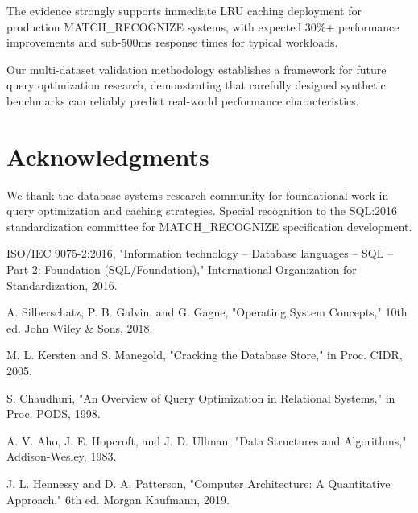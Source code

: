 \documentclass[conference]{IEEEtran}
\begin{document}
The evidence strongly supports immediate LRU caching deployment for production MATCH\_RECOGNIZE systems, with expected 30\%+ performance improvements and sub-500ms response times for typical workloads.

Our multi-dataset validation methodology establishes a framework for future query optimization research, demonstrating that carefully designed synthetic benchmarks can reliably predict real-world performance characteristics.

\section*{Acknowledgments}

We thank the database systems research community for foundational work in query optimization and caching strategies. Special recognition to the SQL:2016 standardization committee for MATCH\_RECOGNIZE specification development.

\begin{thebibliography}{00}
 ISO/IEC 9075-2:2016, "Information technology -- Database languages -- SQL -- Part 2: Foundation (SQL/Foundation)," International Organization for Standardization, 2016.

 A. Silberschatz, P. B. Galvin, and G. Gagne, "Operating System Concepts," 10th ed. John Wiley \& Sons, 2018.

 M. L. Kersten and S. Manegold, "Cracking the Database Store," in Proc. CIDR, 2005.

 S. Chaudhuri, "An Overview of Query Optimization in Relational Systems," in Proc. PODS, 1998.

 A. V. Aho, J. E. Hopcroft, and J. D. Ullman, "Data Structures and Algorithms," Addison-Wesley, 1983.

 J. L. Hennessy and D. A. Patterson, "Computer Architecture: A Quantitative Approach," 6th ed. Morgan Kaufmann, 2019.
\end{thebibliography}
\end{document}
